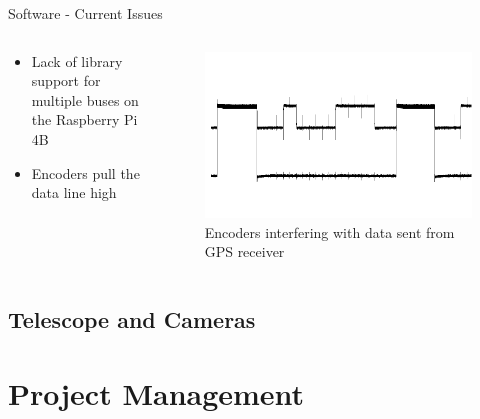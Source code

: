 \documentclass[11pt, aspectratio=169]{beamer}
\begin{document}
\begin{frame}[c]{Software - Current Issues}
    \begin{columns}[t]
        \begin{column}{.4\textwidth}
            \begin{itemize}
                \item Lack of library support for multiple buses on the Raspberry Pi 4B
                \item Encoders pull the data line high
            \end{itemize}
        \end{column}
        
        \begin{column}{.6\textwidth}
            \begin{figure}[H]
                \includegraphics[width=\textwidth]{software/encoder_gps_bus.png}
                \caption{Encoders interfering with data sent from GPS receiver}
            \end{figure}
        \end{column}
    \end{columns}
\end{frame}

\subsection{Telescope and Cameras}

\section{Project Management}
\end{document}
